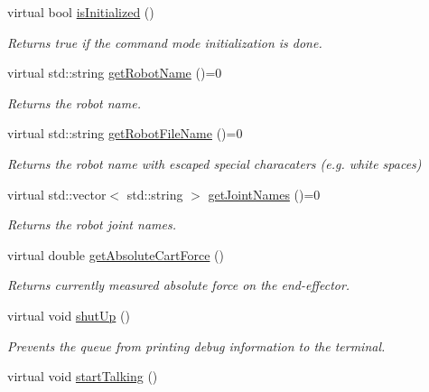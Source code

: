 \begin{DoxyCompactItemize}
virtual bool \hyperlink{classkukadu_1_1ControlQueue_ac6e06776a9e03107aabc111ef5ce2b6d}{is\-Initialized} ()
\begin{DoxyCompactList}\small\item\em Returns true if the command mode initialization is done. \end{DoxyCompactList}\item 
virtual std\-::string \hyperlink{classkukadu_1_1ControlQueue_aff34133be55d32e07d0ce6aac26cf10d}{get\-Robot\-Name} ()=0
\begin{DoxyCompactList}\small\item\em Returns the robot name. \end{DoxyCompactList}\item 
virtual std\-::string \hyperlink{classkukadu_1_1ControlQueue_aab7dbf0d07b829b9612cfe7141c801a1}{get\-Robot\-File\-Name} ()=0
\begin{DoxyCompactList}\small\item\em Returns the robot name with escaped special characaters (e.\-g. white spaces) \end{DoxyCompactList}\item 
virtual std\-::vector$<$ std\-::string $>$ \hyperlink{classkukadu_1_1ControlQueue_a85702573cb64f7f3dd9c3d2eac95a6ea}{get\-Joint\-Names} ()=0
\begin{DoxyCompactList}\small\item\em Returns the robot joint names. \end{DoxyCompactList}\item 
virtual double \hyperlink{classkukadu_1_1ControlQueue_a550f23320f1b124b1cd587605317e37c}{get\-Absolute\-Cart\-Force} ()
\begin{DoxyCompactList}\small\item\em Returns currently measured absolute force on the end-\/effector. \end{DoxyCompactList}\item 
\hypertarget{classkukadu_1_1ControlQueue_a8e76e19772053274046193436b0cae1c}{virtual void \hyperlink{classkukadu_1_1ControlQueue_a8e76e19772053274046193436b0cae1c}{shut\-Up} ()}\label{classkukadu_1_1ControlQueue_a8e76e19772053274046193436b0cae1c}

\begin{DoxyCompactList}\small\item\em Prevents the queue from printing debug information to the terminal. \end{DoxyCompactList}\item 
\hypertarget{classkukadu_1_1ControlQueue_ac9042952868522099628074d22d61742}{virtual void \hyperlink{classkukadu_1_1ControlQueue_ac9042952868522099628074d22d61742}{start\-Talking} ()}\label{classkukadu_1_1ControlQueue_ac9042952868522099628074d22d61742}


\end{DoxyCompactItemize}
